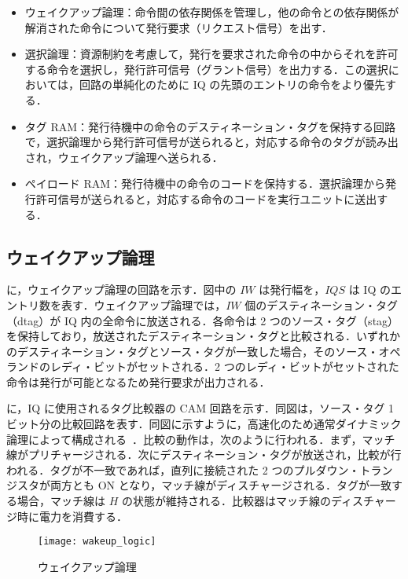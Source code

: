 \begin{itemize}
  \item ウェイクアップ論理：命令間の依存関係を管理し，他の命令との依存関係が解消された命令について発行要求（リクエスト信号）を出す．
  \item 選択論理：資源制約を考慮して，発行を要求された命令の中からそれを許可する命令を選択し，発行許可信号（グラント信号）を出力する．この選択においては，回路の単純化のために IQ の先頭のエントリの命令をより優先する．
  \item タグ RAM：発行待機中の命令のデスティネーション・タグを保持する回路で，選択論理から発行許可信号が送られると，対応する命令のタグが読み出され，ウェイクアップ論理へ送られる．
  \item ペイロード RAM：発行待機中の命令のコードを保持する．選択論理から発行許可信号が送られると，対応する命令のコードを実行ユニットに送出する． 
\end{itemize}

\subsection{ウェイクアップ論理}
\label{sec:wakeup_logic}
に，ウェイクアップ論理の回路を示す．図中の $IW$ は発行幅を，$IQS$ は IQ のエントリ数を表す．ウェイクアップ論理では，$IW$ 個のデスティネーション・タグ（dtag）が IQ 内の全命令に放送される．各命令は 2 つのソース・タグ（stag）を保持しており，放送されたデスティネーション・タグと比較される．いずれかのデスティネーション・タグとソース・タグが一致した場合，そのソース・オペランドのレディ・ビットがセットされる．2 つのレディ・ビットがセットされた命令は発行が可能となるため発行要求が出力される．

に，IQ に使用されるタグ比較器の CAM 回路を示す．同図は，ソース・タグ 1 ビット分の比較回路を表す．同図に示すように，高速化のため通常ダイナミック論理によって構成される~\cite{Palacharla1997}．比較の動作は，次のように行われる．まず，マッチ線がプリチャージされる．次にデスティネーション・タグが放送され，比較が行われる．タグが不一致であれば，直列に接続された 2 つのプルダウン・トランジスタが両方とも ON となり，マッチ線がディスチャージされる．タグが一致する場合，マッチ線は $H$ の状態が維持される．比較器はマッチ線のディスチャージ時に電力を消費する．

\begin{figure}[htb]
  \centering
  \texttt{[image: wakeup\_logic]}
  \caption{ウェイクアップ論理}
  \label{fig:wakeup_logic}
\end{figure}

